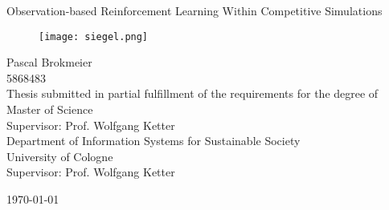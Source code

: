 \begin{titlepage}
\setlength{\parindent}{0pt} %
\begin{center}

\Huge{Observation-based Reinforcement Learning Within Competitive Simulations}

\vspace{10mm}
\begin{figure}[!h]
    \centering
    \texttt{[image: siegel.png]}
\end{figure}

\vspace{10mm}

\small{
Pascal Brokmeier \\ 5868483 \\
}
\vspace{10mm}
\small{Thesis submitted in partial fulfillment of the requirements for the degree of Master of Science\\}
\vspace{10mm}
\small{Supervisor: Prof.  Wolfgang Ketter \\
Department of Information Systems for Sustainable Society \\
University of Cologne\\
Supervisor: Prof.  Wolfgang Ketter }

\vspace{10mm}
\today
{}
\end{center}
\end{titlepage}
